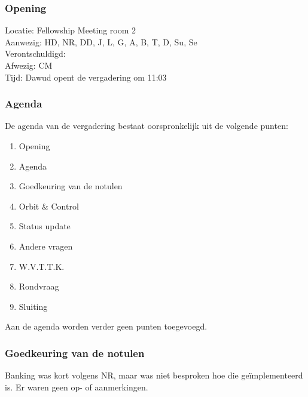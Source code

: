 \subsubsection{Opening}
Locatie: Fellowship Meeting room 2\\
Aanwezig: HD, NR, DD, J, L, G, A, B, T, D, Su, Se\\
Verontschuldigd: \\
Afwezig: CM \\
Tijd: Dawud opent de vergadering om 11:03\\

\subsubsection{Agenda}
De agenda van de vergadering bestaat oorspronkelijk uit de volgende punten:
\begin{enumerate}
\item Opening
\item Agenda
\item Goedkeuring van de notulen
\item Orbit \& Control
\item Status update
\item Andere vragen
\item W.V.T.T.K.
\item Rondvraag
\item Sluiting
\end{enumerate}

Aan de agenda worden verder geen punten toegevoegd.

\subsubsection{Goedkeuring van de notulen}
Banking was kort volgens NR, maar was niet besproken hoe die ge\"{i}mplementeerd is.
Er waren geen op- of aanmerkingen.

